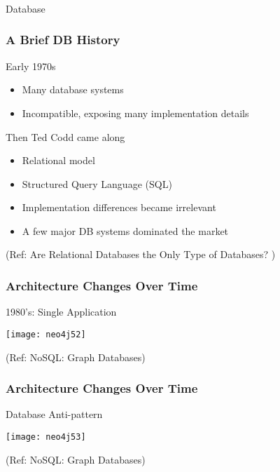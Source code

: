 \begin{frame}[fragile]\frametitle{}
\begin{center}
{\Large Database}
\end{center}
\end{frame}

\begin{frame}\frametitle{A Brief DB History}

Early 1970s

\begin{itemize}
\item Many database systems
\item Incompatible, exposing many implementation details
\end{itemize}

Then Ted Codd came along
\begin{itemize}
\item Relational model
\item Structured Query Language (SQL)
\item Implementation differences became irrelevant
\item A few major DB systems dominated the market
\end{itemize}


{\tiny (Ref: Are Relational Databases the Only Type of Databases? )}
\end{frame}


\begin{frame}\frametitle{Architecture Changes Over Time }
1980’s: Single Application


\begin{center}
\texttt{[image: neo4j52]}
\end{center}	

{\tiny (Ref: NoSQL: Graph Databases)}

\end{frame}

\begin{frame}\frametitle{Architecture Changes Over Time }
Database Anti-pattern


\begin{center}
\texttt{[image: neo4j53]}
\end{center}	

{\tiny (Ref: NoSQL: Graph Databases)}

\end{frame}


